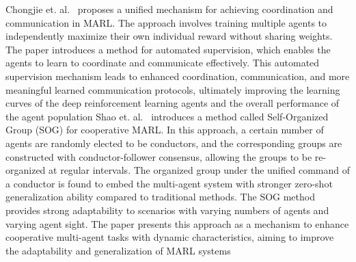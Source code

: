 \documentclass[runningheads]{llncs}
\newcounter{relation}
\begin{document}
Chongjie et. al.~\cite{Chongjie2008} proposes a unified mechanism for achieving coordination and communication in MARL. The approach involves training multiple agents to independently maximize their own individual reward without sharing weights. The paper introduces a method for automated supervision, which enables the agents to learn to coordinate and communicate effectively. This automated supervision mechanism leads to enhanced coordination, communication, and more meaningful learned communication protocols, ultimately improving the learning curves of the deep reinforcement learning agents and the overall performance of the agent population
%
Shao et. al.~\cite{Shao2022} introduces a method called Self-Organized Group (SOG) for cooperative MARL. In this approach, a certain number of agents are randomly elected to be conductors, and the corresponding groups are constructed with conductor-follower consensus, allowing the groups to be re-organized at regular intervals. The organized group under the unified command of a conductor is found to embed the multi-agent system with stronger zero-shot generalization ability compared to traditional methods. The SOG method provides strong adaptability to scenarios with varying numbers of agents and varying agent sight. The paper presents this approach as a mechanism to enhance cooperative multi-agent tasks with dynamic characteristics, aiming to improve the adaptability and generalization of MARL systems
%
%
\end{document}
